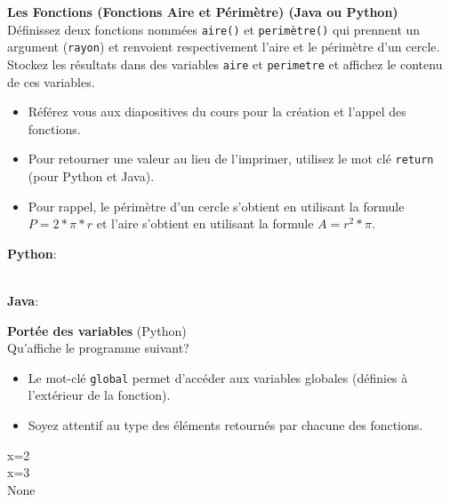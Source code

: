   \begin{Exercice}[5 minutes] \textbf{Les Fonctions (Fonctions Aire et Périmètre) (Java ou Python)}\\
      Définissez deux fonctions nommées \lstinline{aire()} et \lstinline{perimètre()} qui prennent un argument (\lstinline{rayon}) et renvoient respectivement l'aire et le périmètre d'un cercle. Stockez les résultats dans des variables \lstinline{aire} et \lstinline{perimetre} et affichez le contenu de ces variables.   \\
     
      \begin{conseil}
          \begin{itemize}
              \item Référez vous aux diapositives du cours pour la création et l'appel des fonctions.
              \item Pour retourner une valeur au lieu de l'imprimer, utilisez le mot clé \lstinline{return} (pour Python et Java).
              \item Pour rappel, le périmètre d'un cercle s'obtient en utilisant la formule $P = 2*\pi*r$ et l'aire s'obtient en utilisant la formule $A = r^2*\pi$.
          \end{itemize}        
      \end{conseil}
      \begin{solution}
          \textbf{Python}:
          
          
          \textbf{\\Java}:
          
      \end{solution}   
  \end{Exercice} 

  \begin{Exercice}[5 minutes] \textbf{Portée des variables} (Python)\\
    Qu'affiche le programme suivant? \\

    

    
     \begin{conseil}
        \begin{itemize}
            \item Le mot-clé \lstinline{global} permet d'accéder aux variables globales (définies à l'extérieur de la fonction).
            \item Soyez attentif au type des éléments retournés par chacune des fonctions.
        \end{itemize}
     \end{conseil}
     \begin{solution}
            x=2 \\
            x=3 \\
            None   
    \end{solution}
 \end{Exercice}

